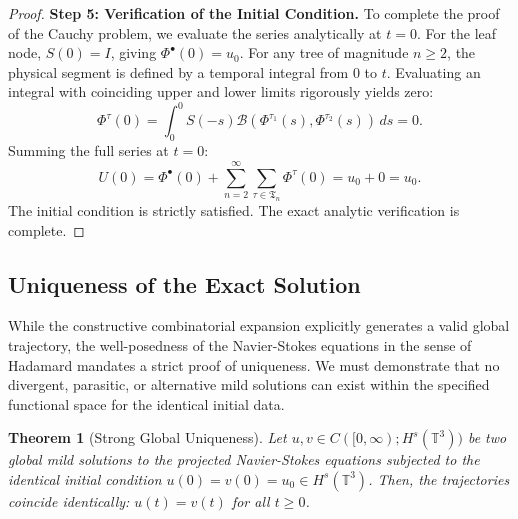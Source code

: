 \documentclass[12pt,a4paper]{article}
\theoremstyle{plain}
\newtheorem{theorem}{Theorem}[section]
\theoremstyle{definition}
\theoremstyle{remark}
\newcommand{\Hs}{H^s}
\newcommand{\T}{\mathbb{T}}
\newcommand{\BB}{\mathcal{B}}
\newcommand{\fT}{\mathfrak{T}}
\begin{document}
\begin{proof}
\textbf{Step 5: Verification of the Initial Condition.}
To complete the proof of the Cauchy problem, we evaluate the series analytically at $t = 0$. For the leaf node, $S(0) = I$, giving $\Phi^\bullet(0) = u_0$. For any tree of magnitude $n \ge 2$, the physical segment is defined by a temporal integral from $0$ to $t$. Evaluating an integral with coinciding upper and lower limits rigorously yields zero:
\[
  \Phi^\tau(0) = \int_0^0 S(-s)\BB(\Phi^{\tau_1}(s), \Phi^{\tau_2}(s))\,ds = 0.
\]
Summing the full series at $t=0$:
\[
  U(0) = \Phi^\bullet(0) + \sum_{n=2}^\infty \sum_{\tau \in \fT_n} \Phi^\tau(0) = u_0 + 0 = u_0.
\]
The initial condition is strictly satisfied. The exact analytic verification is complete.
\end{proof}


\subsection{Uniqueness of the Exact Solution}
\label{subsec:uniqueness}

While the constructive combinatorial expansion explicitly generates a valid global trajectory, the well-posedness of the Navier-Stokes equations in the sense of Hadamard mandates a strict proof of uniqueness. We must demonstrate that no divergent, parasitic, or alternative mild solutions can exist within the specified functional space for the identical initial data.



\begin{theorem}[Strong Global Uniqueness]
\label{thm:strong_uniqueness}
Let $u, v \in C([0,\infty); \Hs(\T^3))$ be two global mild solutions to the projected Navier-Stokes equations subjected to the identical initial condition $u(0) = v(0) = u_0 \in \Hs(\T^3)$. Then, the trajectories coincide identically: $u(t) = v(t)$ for all $t \ge 0$.
\end{theorem}
\end{document}
